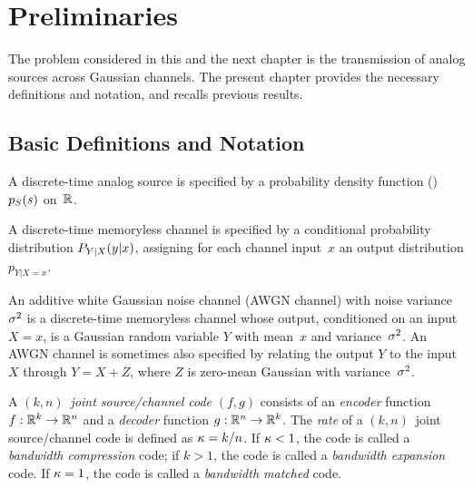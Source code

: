 \chapter{Preliminaries}
\label{ch:prelim}

The problem considered in this and the next chapter is the transmission of
analog sources across Gaussian channels. The present chapter provides the
necessary definitions and notation, and recalls previous results.

\section{Basic Definitions and Notation}
\label{sec:defs}

\begin{definition}[Source]
  \label{def:analogsource}
  A discrete-time analog source is specified by a probability density function
  (\pdf) ${p_S}(s)$ on~$\mathbb{R}$.
\end{definition}

\begin{definition}[Channel]
  \label{def:dtmlc}
  A discrete-time memoryless channel is specified by a conditional probability
  distribution $P_{Y|X}(y|x)$, assigning for each channel input~$x$ an output
  distribution $p_{Y|X=x}$. 
\end{definition}

\begin{definition}
  \label{def:awgn}
  An additive white Gaussian noise channel (AWGN channel) with noise
  variance~${\sigma^2}$ is a discrete-time memoryless channel whose output, conditioned
  on an input $X=x$, is a Gaussian random variable $Y$ with mean~$x$ and
  variance~${\sigma^2}$. An AWGN channel is sometimes also specified by relating the
  output $Y$ to the input $X$ through $Y = X + Z$, where $Z$ is zero-mean
  Gaussian with variance~${\sigma^2}$. 
\end{definition}

\begin{definition}
  \label{def:knsccode}
  A $(k,n)$~\emph{joint source/channel code} $(f,g)$ consists of an
  \emph{encoder} function $f : \mathbb{R}^k \rightarrow \mathbb{R}^n$ and a \emph{decoder}
  function $g:\mathbb{R}^n \rightarrow \mathbb{R}^k$. The \emph{rate} of a $(k,n)$~joint
  source/channel code is defined as $\kappa = k/n$. If $\kappa < 1$, the code is called
  a \emph{bandwidth compression} code; if $k > 1$, the code is called a
  \emph{bandwidth expansion} code. If $\kappa = 1$, the code is called a
  \emph{bandwidth matched} code.
\end{definition}

